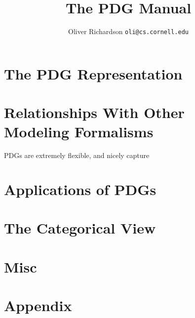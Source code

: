 \documentclass{article}
\title{The PDG Manual}
\author{Oliver Richardson  \texttt{oli@cs.cornell.edu}}
\begin{document}
	
	\maketitle
	
	\tableofcontents
	\clearpage
	
	
	
	\part{The PDG Representation}
	
	
	
	
	
	
	

	\begin{wip}  \end{wip}

	\part{Relationships With Other Modeling Formalisms}
	
	PDGs are extremely flexible, and nicely capture
	
	
	
	
	
	

	\part{Applications of PDGs}
	
	\part{The Categorical View}

	\part{Misc}
	
	

{
    
    
}


	\part*{Appendix}
	\appendix
	
	
	
	\clearpage
	
\end{document}
